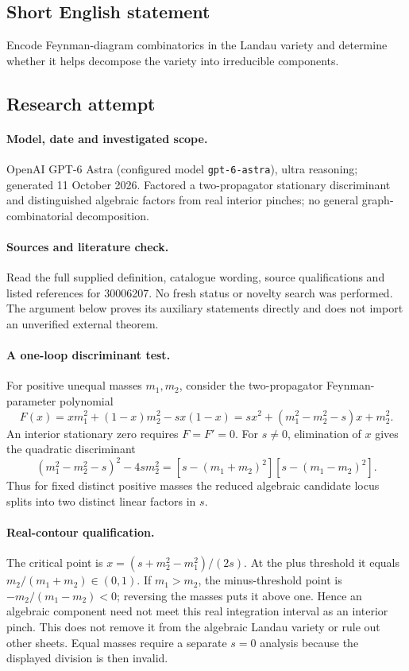 \documentclass[11pt]{article}
\begin{document}
\subsection{Short English statement}
Encode Feynman-diagram combinatorics in the Landau variety and determine whether it helps decompose the variety into irreducible components.
\subsection{Research attempt}
\paragraph{Model, date and investigated scope.}
OpenAI GPT-6 Astra (configured model \texttt{gpt-6-astra}), ultra reasoning; generated 11 October 2026. Factored a two-propagator stationary discriminant and distinguished algebraic factors from real interior pinches; no general graph-combinatorial decomposition.

\paragraph{Sources and literature check.}
Read the full supplied definition, catalogue wording, source qualifications and listed references for 30006207. No fresh status or novelty search was performed. The argument below proves its auxiliary statements directly and does not import an unverified external theorem.

\paragraph{A one-loop discriminant test.} For positive unequal masses \(m_1,m_2\), consider the two-propagator Feynman-parameter polynomial
\[
 F(x)=xm_1^2+(1-x)m_2^2-sx(1-x)
 =sx^2+(m_1^2-m_2^2-s)x+m_2^2.
\]
An interior stationary zero requires \(F=F'=0\). For \(s\ne0\), elimination of \(x\) gives the quadratic discriminant
\[
 (m_1^2-m_2^2-s)^2-4sm_2^2
 =[s-(m_1+m_2)^2][s-(m_1-m_2)^2].
\]
Thus for fixed distinct positive masses the reduced algebraic candidate locus splits into two distinct linear factors in \(s\).
\paragraph{Real-contour qualification.} The critical point is \(x=(s+m_2^2-m_1^2)/(2s)\). At the plus threshold it equals \(m_2/(m_1+m_2)\in(0,1)\). If \(m_1>m_2\), the minus-threshold point is \(-m_2/(m_1-m_2)<0\); reversing the masses puts it above one. Hence an algebraic component need not meet this real integration interval as an interior pinch. This does not remove it from the algebraic Landau variety or rule out other sheets. Equal masses require a separate \(s=0\) analysis because the displayed division is then invalid.
\end{document}
